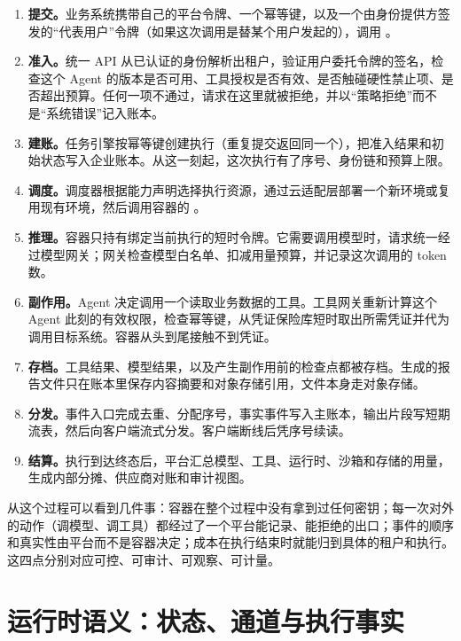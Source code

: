 \begin{enumerate}
  \item \textbf{提交。}业务系统携带自己的平台令牌、一个幂等键，以及一个由身份提供方签发的“代表用户”令牌（如果这次调用是替某个用户发起的），调用 。
  \item \textbf{准入。}统一 API 从已认证的身份解析出租户，验证用户委托令牌的签名，检查这个 Agent 的版本是否可用、工具授权是否有效、是否触碰硬性禁止项、是否超出预算。任何一项不通过，请求在这里就被拒绝，并以“策略拒绝”而不是“系统错误”记入账本。
  \item \textbf{建账。}任务引擎按幂等键创建执行（重复提交返回同一个），把准入结果和初始状态写入企业账本。从这一刻起，这次执行有了序号、身份链和预算上限。
  \item \textbf{调度。}调度器根据能力声明选择执行资源，通过云适配层部署一个新环境或复用现有环境，然后调用容器的 。
  \item \textbf{推理。}容器只持有绑定当前执行的短时令牌。它需要调用模型时，请求统一经过模型网关；网关检查模型白名单、扣减用量预算，并记录这次调用的 token 数。
  \item \textbf{副作用。}Agent 决定调用一个读取业务数据的工具。工具网关重新计算这个 Agent 此刻的有效权限，检查幂等键，从凭证保险库短时取出所需凭证并代为调用目标系统。容器从头到尾接触不到凭证。
  \item \textbf{存档。}工具结果、模型结果，以及产生副作用前的检查点都被存档。生成的报告文件只在账本里保存内容摘要和对象存储引用，文件本身走对象存储。
  \item \textbf{分发。}事件入口完成去重、分配序号，事实事件写入主账本，输出片段写短期流表，然后向客户端流式分发。客户端断线后凭序号续读。
  \item \textbf{结算。}执行到达终态后，平台汇总模型、工具、运行时、沙箱和存储的用量，生成内部分摊、供应商对账和审计视图。
\end{enumerate}

从这个过程可以看到几件事：容器在整个过程中没有拿到过任何密钥；每一次对外的动作（调模型、调工具）都经过了一个平台能记录、能拒绝的出口；事件的顺序和真实性由平台而不是容器决定；成本在执行结束时就能归到具体的租户和执行。这四点分别对应可控、可审计、可观察、可计量。

\section{运行时语义：状态、通道与执行事实}
\label{sec:runtime}

